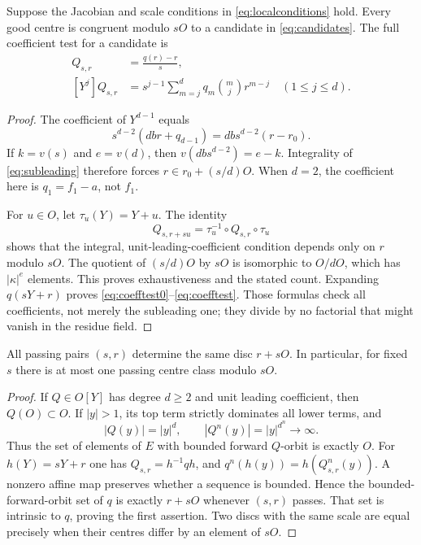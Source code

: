\begin{lemma}\label{lem:centres}
Suppose the Jacobian and scale conditions in
\eqref{eq:localconditions} hold. Every good centre is congruent modulo
$sO$ to a candidate in \eqref{eq:candidates}. The full coefficient
test for a candidate is
\begin{align}
 [Y^0]Q_{s,r}&=\frac{q(r)-r}{s},\label{eq:coefftest0}\\
 [Y^j]Q_{s,r}&=s^{j-1}\sum_{m=j}^d q_m\binom mj r^{m-j}
 \quad(1\le j\le d).\label{eq:coefftest}
\end{align}
\end{lemma}
\begin{proof}
The coefficient of $Y^{d-1}$ equals
\begin{equation}\label{eq:subleading}
 s^{d-2}(dbr+q_{d-1})=dbs^{d-2}(r-r_0).
\end{equation}
If $k=v(s)$ and $e=v(d)$, then $v(dbs^{d-2})=e-k$.
Integrality of \eqref{eq:subleading} therefore forces
$r\in r_0+(s/d)O$. When $d=2$, the coefficient here is
$q_1=f_1-a$, not $f_1$.

For $u\in O$, let $\tau_u(Y)=Y+u$. The identity
\begin{equation}\label{eq:centretranslation}
 Q_{s,r+su}=\tau_u^{-1}\circ Q_{s,r}\circ\tau_u
\end{equation}
shows that the integral, unit-leading-coefficient condition depends
only on $r$ modulo $sO$. The quotient of $(s/d)O$ by $sO$ is
isomorphic to $O/dO$, which has $|\kappa|^e$ elements. This proves
exhaustiveness and the stated count. Expanding $q(sY+r)$ proves
\eqref{eq:coefftest0}--\eqref{eq:coefftest}. Those formulas check all
coefficients, not merely the subleading one; they divide by no
factorial that might vanish in the residue field.
\end{proof}

\begin{lemma}\label{lem:unique}
All passing pairs $(s,r)$ determine the same disc $r+sO$.
In particular, for fixed $s$ there is at most one passing centre
class modulo $sO$.
\end{lemma}
\begin{proof}
If $Q\in O[Y]$ has degree $d\ge2$ and unit leading coefficient,
then $Q(O)\subset O$. If $|y|>1$, its top term strictly dominates
all lower terms, and
\begin{equation}\label{eq:escape}
 |Q(y)|=|y|^d,\qquad |Q^n(y)|=|y|^{d^n}\longrightarrow\infty.
\end{equation}
Thus the set of elements of $E$ with bounded forward $Q$-orbit is
exactly $O$. For $h(Y)=sY+r$ one has $Q_{s,r}=h^{-1}qh$, and
$q^n(h(y))=h(Q_{s,r}^n(y))$. A nonzero affine map preserves whether
a sequence is bounded. Hence the bounded-forward-orbit set of $q$
is exactly $r+sO$ whenever $(s,r)$ passes. That set is intrinsic to
$q$, proving the first assertion. Two discs with the same scale
are equal precisely when their centres differ by an element of $sO$.
\end{proof}

